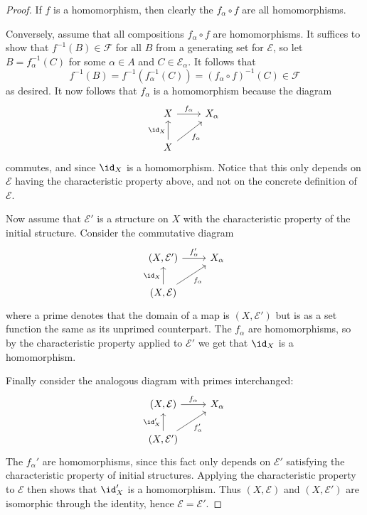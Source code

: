 \documentclass[article, a4paper, 11pt, oneside]{memoir}
\numberwithin{equation}{chapter}
\newcommand{\calE}{\mathcal{E}}
\newcommand{\calF}{\mathcal{F}}
\begin{document}
\begin{proof}
    If $f$ is a homomorphism, then clearly the $f_\alpha \circ f$ are all homomorphisms.

    Conversely, assume that all compositions $f_\alpha \circ f$ are homomorphisms. It suffices to show that $f^{-1}(B) \in \calF$ for all $B$ from a generating set for $\calE$, so let $B = f_\alpha^{-1}(C)$ for some $\alpha \in A$ and $C \in \calE_\alpha$. It follows that
    \begin{equation*}
        f^{-1}(B)
            = f^{-1}(f_\alpha^{-1}(C))
            = (f_\alpha \circ f)^{-1}(C)
            \in \calF
    \end{equation*}
    as desired. It now follows that $f_\alpha$ is a homomorphism because the diagram
    \begin{equation*}
        \begin{tikzcd}
            X
                \ar[r, "f_\alpha"]
            & X_\alpha \\
            X
                \ar[u, "\id_X"]
                \ar[ur, "f_\alpha", swap]
        \end{tikzcd}
    \end{equation*}
    commutes, and since $\id_X$ is a homomorphism. Notice that this only depends on $\calE$ having the characteristic property above, and not on the concrete definition of $\calE$.

    Now assume that $\calE'$ is a structure on $X$ with the characteristic property of the initial structure. Consider the commutative diagram
    \begin{equation*}
        \begin{tikzcd}
            (X,\calE')
                \ar[r, "f_\alpha'"]
            & X_\alpha \\
            (X,\calE)
                \ar[u, "\id_X"]
                \ar[ur, "f_\alpha", swap]
        \end{tikzcd}
    \end{equation*}
    where a prime denotes that the domain of a map is $(X,\calE')$ but is as a set function the same as its unprimed counterpart. The $f_\alpha$ are homomorphisms, so by the characteristic property applied to $\calE'$ we get that $\id_X$ is a homomorphism.

    Finally consider the analogous diagram with primes interchanged:
    \begin{equation*}
        \begin{tikzcd}
            (X,\calE)
                \ar[r, "f_\alpha"]
            & X_\alpha \\
            (X,\calE')
                \ar[u, "\id_X'"]
                \ar[ur, "f_\alpha'", swap]
        \end{tikzcd}
    \end{equation*}
    The $f_\alpha'$ are homomorphisms, since this fact only depends on $\calE'$ satisfying the characteristic property of initial structures. Applying the characteristic property to $\calE$ then shows that $\id_X'$ is a homomorphism. Thus $(X,\calE)$ and $(X,\calE')$ are isomorphic through the identity, hence $\calE = \calE'$.
\end{proof}
\end{document}
